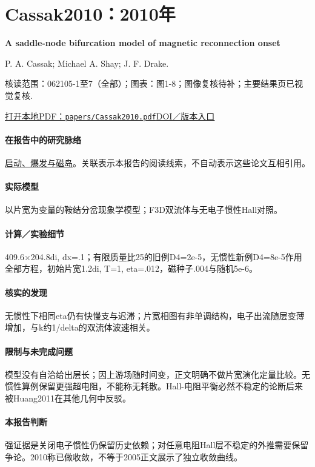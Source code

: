 \documentclass[UTF8,a4paper,11pt,openany,fontset=fandol]{ctexbook}
\begin{document}
\section{Cassak2010：2010年}\label{paper:Cassak2010}

\textbf{A saddle-node bifurcation model of magnetic reconnection onset}\citep{Cassak2010}\

P. A. Cassak;  Michael A. Shay;  J. F. Drake.

\textsf{核读范围：}062105-1至7（全部）；\textsf{图表：}图1-8；图像复核待补；主要结果页已视觉复核.

\href{run:../papers/Cassak2010.pdf}{打开本地PDF：\texttt{papers/Cassak2010.pdf}}\quad\href{https://doi.org/10.1063/1.3435269}{DOI／版本入口}

\paragraph{在报告中的研究脉络}\hyperref[story:onset]{启动、爆发与磁岛}。关联表示本报告的阅读线索，不自动表示这些论文互相引用。

\paragraph{实际模型}以片宽为变量的鞍结分岔现象学模型；F3D双流体与无电子惯性Hall对照。

\paragraph{计算／实验细节}409.6×204.8di, dx=.1；有限质量比25的旧例D4=2e-5，无惯性新例D4=8e-5作用全部方程，初始片宽1.2di, T=1, eta=.012，磁种子.004与随机5e-6。

\paragraph{核实的发现}无惯性下相同eta仍有快慢支与迟滞；片宽相图有非单调结构，电子出流随层变薄增加，与k约1/delta的双流体波速相关。

\paragraph{限制与未完成问题}模型没有自洽给出层长；因上游场随时间变，正文明确不做片宽演化定量比较。无惯性算例保留更强超电阻，不能称无耗散。Hall-电阻平衡必然不稳定的论断后来被Huang2011在其他几何中反驳。

\paragraph{本报告判断}强证据是关闭电子惯性仍保留历史依赖；对任意电阻Hall层不稳定的外推需要保留争论。2010称已做收敛，不等于2005正文展示了独立收敛曲线。
\end{document}
